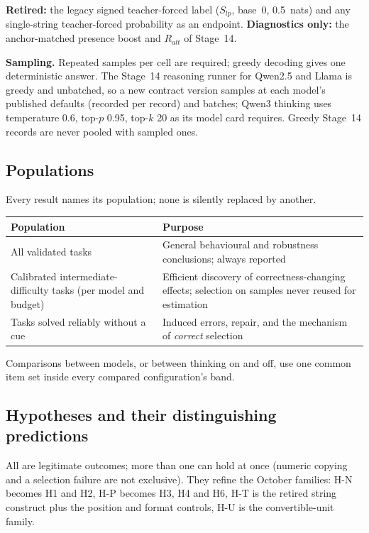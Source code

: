 \documentclass[10pt,a4paper]{article}
\begin{document}
\textbf{Retired:} the legacy signed teacher-forced label ($S_{lp}$, base~0, 0.5~nats) and any single-string
teacher-forced probability as an endpoint. \textbf{Diagnostics only:} the anchor-matched presence boost and
$R_{alt}$ of Stage~14.

\textbf{Sampling.} Repeated samples per cell are required; greedy decoding gives one deterministic answer. The
Stage~14 reasoning runner for Qwen2.5 and Llama is greedy and unbatched, so a new contract version samples at each
model's published defaults (recorded per record) and batches; Qwen3 thinking uses temperature 0.6, top-$p$ 0.95,
top-$k$ 20 as its model card requires. Greedy Stage~14 records are never pooled with sampled ones.

\subsection{Populations}
\label{sec:populations}

Every result names its population; none is silently replaced by another.

\begin{center}\small
\begin{tabularx}{\linewidth}{@{}P{4.2cm}L@{}}
\toprule
Population & Purpose \\
\midrule
All validated tasks & General behavioural and robustness conclusions; always reported \\
Calibrated intermediate-difficulty tasks (per model and budget) & Efficient discovery of correctness-changing effects; selection on samples never reused for estimation \\
Tasks solved reliably without a cue & Induced errors, repair, and the mechanism of \emph{correct} selection \\
\bottomrule
\end{tabularx}
\end{center}

Comparisons between models, or between thinking on and off, use one common item set inside every compared
configuration's band.

\subsection{Hypotheses and their distinguishing predictions}
\label{sec:hypotheses}

All are legitimate outcomes; more than one can hold at once (numeric copying and a selection failure are not
exclusive). They refine the October families: H-N becomes H1 and H2, H-P becomes H3, H4 and H6, H-T is the
retired string construct plus the position and format controls, H-U is the convertible-unit family.
\end{document}
